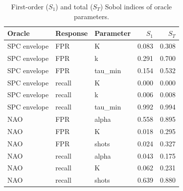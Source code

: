 \begin{table}[t]
\centering
\caption{First-order ($S_1$) and total ($S_T$) Sobol indices of oracle parameters.}
\label{tab:design-sobol}
\small
\begin{tabular}{lllrr}
\toprule
Oracle & Response & Parameter & $S_1$ & $S_T$ \\
\midrule
SPC envelope & FPR & K & 0.083 & 0.308 \\
SPC envelope & FPR & k & 0.291 & 0.700 \\
SPC envelope & FPR & tau\_min & 0.154 & 0.532 \\
SPC envelope & recall & K & 0.000 & 0.000 \\
SPC envelope & recall & k & 0.006 & 0.008 \\
SPC envelope & recall & tau\_min & 0.992 & 0.994 \\
NAO & FPR & alpha & 0.558 & 0.895 \\
NAO & FPR & K & 0.018 & 0.295 \\
NAO & FPR & shots & 0.024 & 0.327 \\
NAO & recall & alpha & 0.043 & 0.175 \\
NAO & recall & K & 0.062 & 0.231 \\
NAO & recall & shots & 0.639 & 0.880 \\
\bottomrule
\end{tabular}
\end{table}
